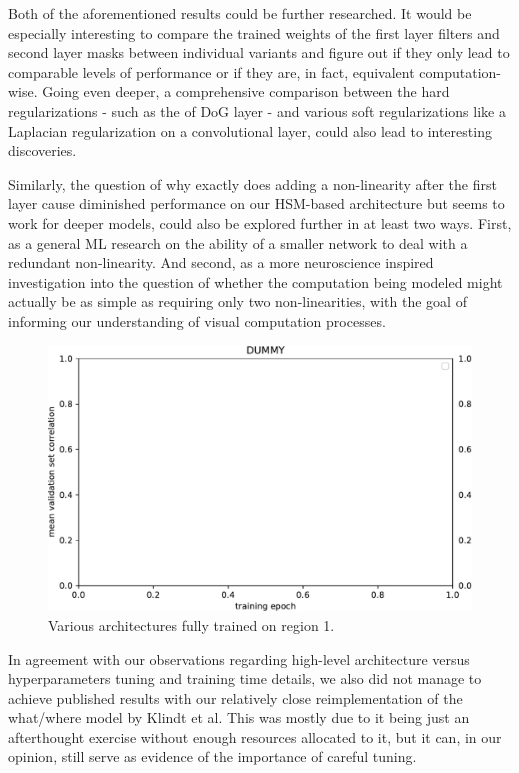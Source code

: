 Both of the aforementioned results could be further researched. It would be especially interesting to compare the trained weights of the first layer filters and second layer masks between individual variants and figure out if they only lead to comparable levels of performance or if they are, in fact, equivalent computation-wise. Going even deeper, a comprehensive comparison between the hard regularizations - such as the of DoG layer - and various soft regularizations like a Laplacian regularization on a convolutional layer, could also lead to interesting discoveries. 

Similarly, the question of why exactly does adding a non-linearity after the first layer cause diminished performance on our HSM-based architecture but seems to work for deeper models, could also be explored further in at least two ways. First, as a general ML research on the ability of a smaller network to deal with a redundant non-linearity. And second, as a more neuroscience inspired investigation into the question of whether the computation being modeled might actually be as simple as requiring only two non-linearities, with the goal of informing our understanding of visual computation processes.

\begin{figure}[H]
    \centering
    \includegraphics[width=1\textwidth]{../figures/05_dummy}
    \caption[Various architectures on region 1]{Various architectures fully trained on region 1.}
    \label{fig:5.3.2.1_1}
\end{figure}

In agreement with our observations regarding high-level architecture versus hyperparameters tuning and training time details, we also did not manage to achieve published results with our relatively close reimplementation of the what/where model by Klindt et al. This was mostly due to it being just an afterthought exercise without enough resources allocated to it, but it can, in our opinion, still serve as evidence of the importance of careful tuning. 

